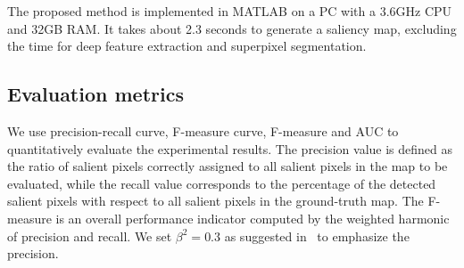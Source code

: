 \documentclass[journal]{IEEEtran}
\begin{document}
The proposed method is implemented in MATLAB on a PC with a 3.6GHz CPU and 32GB RAM. It takes about 2.3 seconds to generate a saliency map, excluding the time for deep feature extraction and superpixel segmentation.

\subsection{Evaluation metrics}
We use precision-recall curve, F-measure curve, F-measure and AUC to quantitatively evaluate the experimental results. The precision value is defined as the ratio of salient pixels correctly assigned to all salient pixels in the map to be evaluated, while the recall value corresponds to the percentage of the detected salient pixels with respect to all salient pixels in the ground-truth map. The F-measure is an overall performance indicator computed by the weighted harmonic of precision and recall. We set $\beta^2 = 0.3$ as suggested in~\cite{Achanta2009Frequency} to emphasize the precision. 
\end{document}
